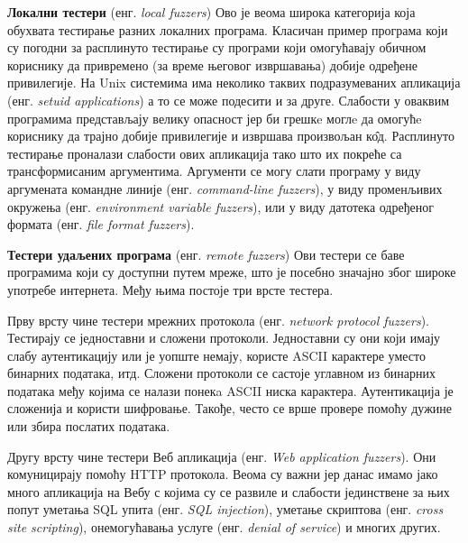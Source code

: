 \documentclass[12pt,oneside]{memoir}
\begin{document}
\begin{description}
\item \textbf{Локални тестери} (енг. \textit{local fuzzers}) Ово је веома широка категорија која обухвата тестирање разних локалних програма. Класичан пример програма који су погодни за расплинуто тестирање су програми који омогућавају обичном кориснику да привремено (за време његовог извршавања) добије одређене привилегије. На Unix системима има неколико таквих подразумеваних апликација (енг. \textit{setuid applications}) а то се може подесити и за друге. Слабости у оваквим програмима представљају велику опасност јер би грешкe моглe да омогућe кориснику да трајно добије привилегије и извршава произвољан к\^{о}д. Расплинуто тестирање проналази слабости ових апликација тако што их покреће са трансформисаним аргументима. Аргументи се могу слати програму у виду аргумената командне линије (енг. \textit{command-line fuzzers}), у виду променљивих окружења (енг. \textit{environment variable fuzzers}), или у виду датотека одређеног формата (енг. \textit{file format fuzzers}).
\item \textbf{Тестери удаљених програма} (енг. \textit{remote fuzzers}) Ови тестери се баве програмима који су доступни путем мреже, што је посебно значајно због широке употребе интернета. Међу њима постоје три врсте тестера. 

Прву врсту чине тестери мрежних протокола (енг. \textit{network protocol fuzzers}). Тестирају се једноставни и сложени протоколи. Једноставни су они који имају слабу аутентикацију или је уопште немају, користе ASCII карактере уместо бинарних података, итд. Сложени протоколи се састоје углавном из бинарних података међу којима се налази понекa ASCII ниска карактера. Аутентикација је сложенија и користи шифровање. Такође, често се врше провере помоћу дужине или збира послатих података.  

Другу врсту чине тестери Веб апликација (енг. \textit{Web application fuzzers}). Они комуницирају помоћу HTTP протокола. Веома су важни јер данас имамо јако много апликација на Вебу с којима су се развиле и слабости јединствене за њих попут уметања SQL упита (енг. \textit{SQL injection}), уметање скриптова (енг. \textit{cross site scripting}), онемогућавања услуге (енг. \textit{denial of service}) и многих других.


\end{description}
\end{document}
